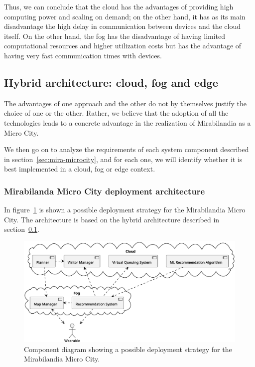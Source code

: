 Thus, we can conclude that the cloud has the advantages of providing high computing power and scaling on demand; on the other hand, it has as its
main disadvantage the high delay in communication between devices and the cloud itself. On the other hand, the fog has the disadvantage of having
limited computational resources and higher utilization costs but has the advantage of having very fast communication times with devices.

\subsection{Hybrid architecture: cloud, fog and edge}\label{sec:hybrid-arch}
The advantages of one approach and the other do not by themselves justify the choice of one or the other. Rather, we believe that the adoption of all
the technologies leads to a concrete advantage in the realization of Mirabilandia as a Micro City.

We then go on to analyze the requirements of each system component described in section~\ref{sec:mira-microcity}, and for each one, we will identify
whether it is best implemented in a cloud, fog or edge context.

\subsubsection{Mirabilanda Micro City deployment architecture}
In figure~\ref{fig:deployment} is shown a possible deployment strategy for the Mirabilandia Micro City. The architecture is based on the hybrid
architecture described in section~\ref{sec:hybrid-arch}.

\begin{figure}[H]
	\centering
	\includegraphics[width=\textwidth]{img/deployment.eps}
	\caption{Component diagram showing a possible deployment strategy for the Mirabilandia Micro City.}
	\label{fig:deployment}
\end{figure}

